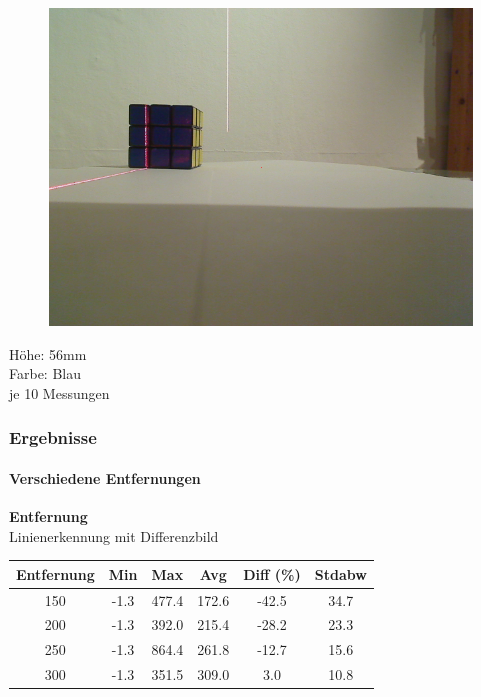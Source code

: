 \documentclass[xcolor=dvipsnames]{beamer}
\begin{document}
\begin{frame}
\begin{figure}
\begin{minipage}{0.32\linewidth}
		\end{minipage}
		\hfill
		\begin{minipage}{0.32\linewidth}
			\includegraphics[width=\linewidth]{includes/test_dist_3}
		\end{minipage}
	\end{figure}
	Höhe: 56mm\\
	Farbe: Blau\\
	je 10 Messungen
	
\end{frame}

\begin{frame}
	\frametitle{Ergebnisse}
	\framesubtitle{Verschiedene Entfernungen}
		\textbf{Entfernung}\\
		
		Linienerkennung mit Differenzbild
		\begin{tabular}{c|c|c|c|c|c}
			Entfernung & Min & Max & Avg & Diff (\%) & Stdabw\\ \hline
150 &      -1.3 & 477.4 & 172.6 & -42.5 & 34.7\\
200 &      -1.3 & 392.0 & 215.4 & -28.2 & 23.3\\
250 &      -1.3 & 864.4 & 261.8 & -12.7 & 15.6\\
300 &      -1.3 & 351.5 & 309.0 & 3.0 & 10.8\\

		\end{tabular}
		
		
\end{frame}
\end{document}
